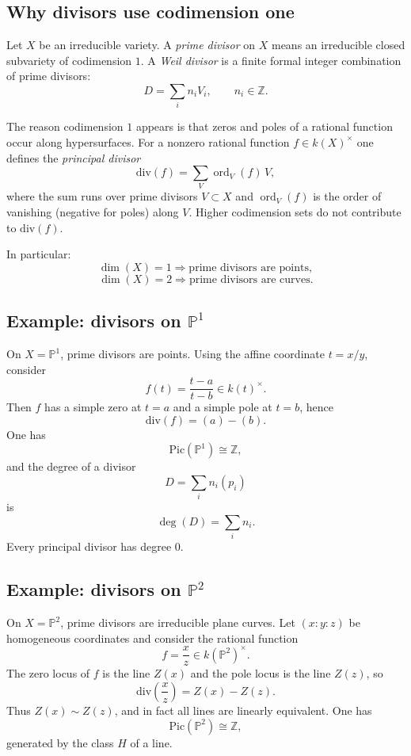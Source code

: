 \documentclass[12pt,a4paper]{article}
\theoremstyle{plain}
\theoremstyle{definition}      %
\begin{document}
\subsection*{Why divisors use codimension one}

Let $X$ be an irreducible variety.
A \emph{prime divisor} on $X$ means an irreducible closed subvariety of codimension $1$.
A \emph{Weil divisor} is a finite formal integer combination of prime divisors:
\[
D=\sum_i n_i V_i,
\qquad
n_i\in \mathbb Z.
\]

The reason codimension $1$ appears is that zeros and poles of a rational function occur along hypersurfaces.
For a nonzero rational function $f\in k(X)^\times$ one defines the \emph{principal divisor}
\[
\mathrm{div}(f)=\sum_{V} \operatorname{ord}_{V}(f)\,V,
\]
where the sum runs over prime divisors $V\subset X$ and $\operatorname{ord}_{V}(f)$ is the order of vanishing (negative for poles) along $V$.
Higher codimension sets do not contribute to $\mathrm{div}(f)$.

In particular:
\[
\dim(X)=1 \Longrightarrow \text{prime divisors are points},
\]
\[
\dim(X)=2 \Longrightarrow \text{prime divisors are curves}.
\]

\subsection*{Example: divisors on $\mathbb P^1$}

On $X=\mathbb P^1$, prime divisors are points.
Using the affine coordinate $t=x/y$, consider
\[
f(t)=\frac{t-a}{t-b}\in k(t)^\times.
\]
Then $f$ has a simple zero at $t=a$ and a simple pole at $t=b$, hence
\[
\mathrm{div}(f)=(a)-(b).
\]
One has
\[
\mathrm{Pic}(\mathbb P^1)\cong \mathbb Z,
\]
and the degree of a divisor
\[
D=\sum_i n_i(p_i)
\]
is
\[
\deg(D)=\sum_i n_i.
\]
Every principal divisor has degree $0$.

\subsection*{Example: divisors on $\mathbb P^2$}

On $X=\mathbb P^2$, prime divisors are irreducible plane curves.
Let $(x:y:z)$ be homogeneous coordinates and consider the rational function
\[
f=\frac{x}{z}\in k(\mathbb P^2)^\times.
\]
The zero locus of $f$ is the line $Z(x)$ and the pole locus is the line $Z(z)$, so
\[
\mathrm{div}\!\left(\frac{x}{z}\right)=Z(x)-Z(z).
\]
Thus $Z(x)\sim Z(z)$, and in fact all lines are linearly equivalent.
One has
\[
\mathrm{Pic}(\mathbb P^2)\cong \mathbb Z,
\]
generated by the class $H$ of a line.
\end{document}
